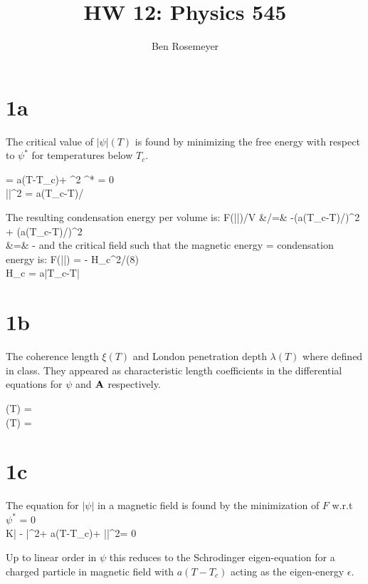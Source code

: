 \documentclass[a4paper,11pt]{article}
\title{HW 12: Physics 545}
\author{Ben Rosemeyer}
\begin{document}
\maketitle

\section*{1a}

The critical value of $|\psi|(T)$ is found by minimizing the free energy with respect to $\psi^*$ for temperatures below $T_c$.

\bea
{} = a(T-T_c)\psi + \beta \psi^2 \psi^* = 0 \\
\Rightarrow |\psi|^2 = a(T_c-T)/\beta
\eea 

The resulting condensation energy per volume is:
\bea
\Delta F(|\psi|)/V &/=& -\beta (a(T_c-T)/\beta)^2 + (a(T_c-T)/\beta)^2 \\
	&=& -
\eea
and the critical field such that the magnetic energy = condensation energy is:
\bea
\Delta F(|\psi|) =  - H_c^2/(8\pi) \\
	H_c =  a|T_c-T|\sqrt{\frac{4\pi}{\beta}}
\eea

\section*{1b}
The coherence length $\xi(T)$ and London penetration depth $\lambda(T)$ where defined in class. They appeared as characteristic length coefficients in the differential equations for $\psi$ and ${\bf A}$ respectively.

\bea
\xi(T) =    \\
\lambda(T) = 
\eea

\section*{1c}
The equation for $|\psi|$ in a magnetic field is found by the minimization of $F$ w.r.t $\psi^*$
\bea
{} = 0 \\
\Rightarrow K\bigg| - \vA\bigg|^2\psi + a(T-T_c)\psi + \beta |\psi|^2\psi = 0
\eea

Up to linear order in $\psi$ this reduces to the Schrodinger eigen-equation for a charged particle in magnetic field with $a(T-T_c)$ acting as the eigen-energy $\epsilon$. 
\end{document}
